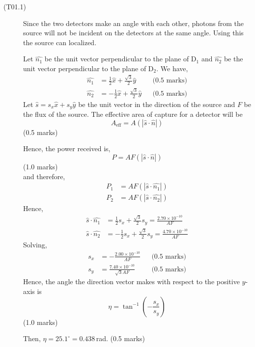 \begin{description}
\item[(T01.1)]
Since the two detectors make an angle with each other, photons from the
source will not be incident on the detectors at the same angle. Using this
the source can localized.

Let $\widehat{n_1}$ be the unit vector perpendicular to the plane of
D$_1$ and $\widehat{n_2}$ be the unit vector perpendicular to the plane of
D$_2$. We have,
\begin{align*}
\widehat{n_1} &= \frac{1}{2}\widehat{x} + \frac{\sqrt{3}}{2}\widehat{y}
  && \text{(0.5 marks)} \\
\widehat{n_2} &= -\frac{1}{2}\widehat{x} + \frac{\sqrt{3}}{2}\widehat{y}
  && \text{(0.5 marks)}
\end{align*}
Let $\widehat{s} = s_x\widehat{x} + s_y\widehat{y}$ be the unit vector in
the direction of the source and $F$ be the flux of the source. The
effective area of capture for a detector will be
\[ A_{\mathrm{eff}} = A(|\widehat{s} \cdot \widehat{n}|) \]
\hfill(0.5 marks)

Hence, the power received is,
\[ P = AF(|\widehat{s} \cdot \widehat{n}|) \]
\hfill(1.0 marks)\\
and therefore,
\begin{align*}
P_1 &= AF(|\widehat{s} \cdot \widehat{n_1}|) \\
P_2 &= AF(|\widehat{s} \cdot \widehat{n_2}|)
\end{align*}
Hence,
\begin{align*}
\widehat{s} \cdot \widehat{n_1}
  &= \frac{1}{2}s_x + \frac{\sqrt{3}}{2}s_y
   = \frac{2.70 \times 10^{-10}}{AF} \\
\widehat{s} \cdot \widehat{n_2}
  &= -\frac{1}{2}s_x + \frac{\sqrt{3}}{2}s_y
   = \frac{4.70 \times 10^{-10}}{AF}
\end{align*}
Solving,
\begin{align*}
s_x &= -\frac{2.00 \times 10^{-10}}{AF}
  && \text{(0.5 marks)} \\
s_y &= \frac{7.40 \times 10^{-10}}{\sqrt{3}AF}
  && \text{(0.5 marks)}
\end{align*}
Hence, the angle the direction vector makes with respect to the positive
$y$-axis is
\[ \eta = \tan^{-1}\left(-\frac{s_x}{s_y}\right) \]
\hfill(1.0 marks)

Then, $\eta = 25.1^\circ = 0.438$\,rad. \hfill(0.5 marks)


\end{description}
